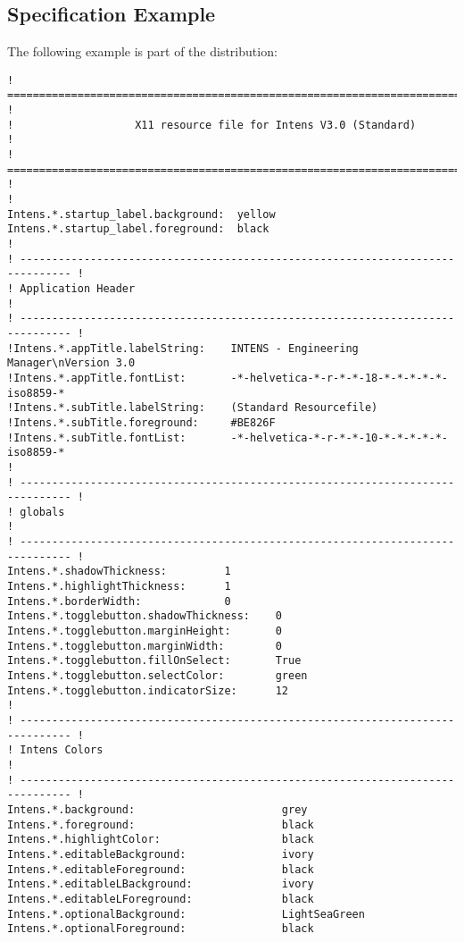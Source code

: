 \subsection{Specification Example}
The following example is part of the \INTENS{} distribution:
{\small
\begin{verbatim}
! ============================================================================== !
!                   X11 resource file for Intens V3.0 (Standard)                 !
! ============================================================================== !
!
Intens.*.startup_label.background:  yellow
Intens.*.startup_label.foreground:  black
!
! ------------------------------------------------------------------------------ !
! Application Header                                                             !
! ------------------------------------------------------------------------------ !
!Intens.*.appTitle.labelString:    INTENS - Engineering Manager\nVersion 3.0
!Intens.*.appTitle.fontList:       -*-helvetica-*-r-*-*-18-*-*-*-*-*-iso8859-*
!Intens.*.subTitle.labelString:    (Standard Resourcefile)
!Intens.*.subTitle.foreground:     #BE826F
!Intens.*.subTitle.fontList:       -*-helvetica-*-r-*-*-10-*-*-*-*-*-iso8859-*
!
! ------------------------------------------------------------------------------ !
! globals                                                                        !
! ------------------------------------------------------------------------------ !
Intens.*.shadowThickness:         1
Intens.*.highlightThickness:      1
Intens.*.borderWidth:             0
Intens.*.togglebutton.shadowThickness:    0
Intens.*.togglebutton.marginHeight:       0
Intens.*.togglebutton.marginWidth:        0
Intens.*.togglebutton.fillOnSelect:       True
Intens.*.togglebutton.selectColor:        green
Intens.*.togglebutton.indicatorSize:      12
!
! ------------------------------------------------------------------------------ !
! Intens Colors                                                                  !
! ------------------------------------------------------------------------------ !
Intens.*.background:                       grey
Intens.*.foreground:                       black
Intens.*.highlightColor:                   black
Intens.*.editableBackground:               ivory
Intens.*.editableForeground:               black
Intens.*.editableLBackground:              ivory
Intens.*.editableLForeground:              black
Intens.*.optionalBackground:               LightSeaGreen
Intens.*.optionalForeground:               black

\end{verbatim}}
